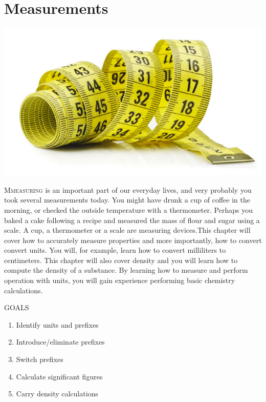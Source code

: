 \documentclass[main.tex]{subfiles}
\begin{document}
\linenumbers



\chapter[Measurements]{Measurements}
\label{ch:measurements}

\begin{marginfigure}
      \includegraphics{figure1}
      \label{fig:marginfig}
   \end{marginfigure}
\lettrine[lines=4]{\color{black!45}M}{measuring} is an important part of our everyday lives, and very probably you took several measurements today. You might have drunk a cup of coffee in the morning, or checked the outside temperature with a thermometer. Perhaps you baked a cake following a recipe and measured the mass of flour and sugar using a scale. A cup, a thermometer or a scale are measuring devices.This chapter will cover how to accurately measure properties and more importantly, how to convert convert units. You will, for example, learn how to convert milliliters to centimeters. This chapter will also cover density and you will learn how to compute the density of a substance. By learning how to measure and perform operation with units, you will gain experience performing basic chemistry calculations.
\begin{marginfigure}%
\begin{mytcbox}{GOALS}
\begin{enumerate}[label=\protect\circled{\color{white}\arabic*}]
\item Identify units and prefixes
\item Introduce/eliminate prefixes
\item Switch prefixes
\item Calculate significant figures
\item Carry density calculations
\end{enumerate}
\end{mytcbox}
\end{marginfigure}%
\end{document}
